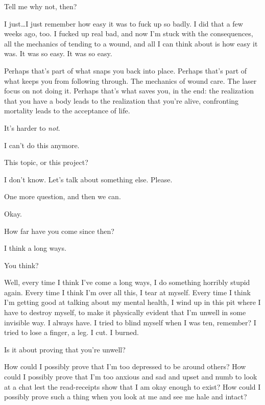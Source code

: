 \begin{paracol}{2}
\begin{leftcolumn}
\begin{ally}
Tell me why not, then?
\end{ally}
I just\ldots{}I just remember how easy it was to fuck up so badly. I did that a few weeks ago, too. I fucked up real bad, and now I'm stuck with the consequences, all the mechanics of tending to a wound, and all I can think about is how easy it was. It was so easy. It was so easy.

\begin{ally}
Perhaps that's part of what snaps you back into place. Perhaps that's part of what keeps you from following through. The mechanics of wound care. The laser focus on not doing it. Perhaps that's what saves you, in the end: the realization that you have a body leads to the realization that you're alive, confronting mortality leads to the acceptance of life.
\end{ally}
It's harder to \emph{not}.
\newpage

\noindent I can't do this anymore.

\begin{ally}
This topic, or this project?
\end{ally}
I don't know.
\newpage
{}
\noindent Let's talk about something else. Please.

\begin{ally}
One more question, and then we can.
\end{ally}
Okay.

\begin{ally}
How far have you come since then?
\end{ally}
I think a long ways.

\begin{ally}
You think?
\end{ally}
Well, every time I think I've come a long ways, I do something horribly stupid again. Every time I think I'm over all this, I tear at myself. Every time I think I'm getting good at talking about my mental health, I wind up in this pit where I have to destroy myself, to make it physically evident that I'm unwell in some invisible way. I always have. I tried to blind myself when I was ten, remember? I tried to lose a finger, a leg. I cut. I burned.

\begin{ally}
Is it about proving that you're unwell?
\end{ally}
How could I possibly prove that I'm too depressed to be around others? How could I possibly prove that I'm too anxious and sad and upset and numb to look at a chat lest the read-receipts show that I am okay enough to exist? How could I possibly prove such a thing when you look at me and see me hale and intact?


\end{leftcolumn}
\end{paracol}

